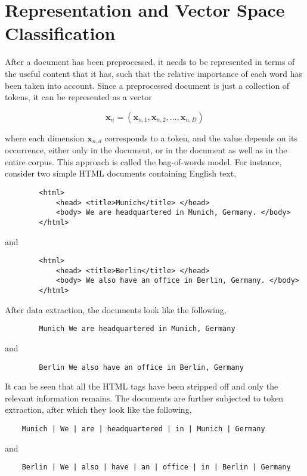\section{Representation and Vector Space Classification}
After a document has been preprocessed, it needs to be represented in terms of the useful content that it has, such that the relative importance of each word has been taken into account. Since a preprocessed document is just a collection of tokens, it can be represented as a vector

$$\mathbf{x}_{n} = (\mathbf{x}_{n, 1}, \mathbf{x}_{n, 2}, ... , \mathbf{x}_{n, D})$$

where each dimension $\mathbf{x}_{n, d}$ corresponds to a token, and the value depends on its occurrence, either only in the document, or in the document as well as in the entire corpus. This approach is called the bag-of-words model. For instance, consider two simple HTML documents containing English text,

\begin{center}
    \begin{verbatim}
        <html>
            <head> <title>Munich</title> </head>
            <body> We are headquartered in Munich, Germany. </body>
        </html>
    \end{verbatim}
    and
    \begin{verbatim}
        <html>
            <head> <title>Berlin</title> </head>
            <body> We also have an office in Berlin, Germany. </body>
        </html>
    \end{verbatim}
\end{center}

After data extraction, the documents look like the following,

\begin{center}
    \begin{verbatim}
        Munich We are headquartered in Munich, Germany
    \end{verbatim}
    and
    \begin{verbatim}
        Berlin We also have an office in Berlin, Germany
    \end{verbatim}
\end{center}

It can be seen that all the HTML tags have been stripped off and only the relevant information remains. The documents are further subjected to token extraction, after which they look like the following,

\begin{center}
    \begin{verbatim}
    Munich | We | are | headquartered | in | Munich | Germany
    \end{verbatim}
    and
    \begin{verbatim}
    Berlin | We | also | have | an | office | in | Berlin | Germany
    \end{verbatim}
\end{center}

